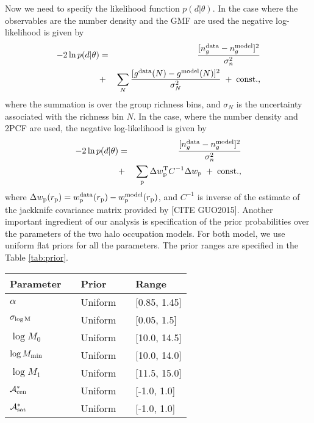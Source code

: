 \documentclass[14pt, preprint]{emulateapj}
\newcommand{\wpp}{w_{\rm p}}
\newcommand{\rpp}{r_{\rm p}}
\newcommand{\mzero}{\log M_{0}}
\newcommand{\mone}{\log M_{1}}
\newcommand{\mmin}{\log M_{\rm min}}
\newcommand{\sigmam}{\sigma_{\log \rm M}}
\newcommand{\acen}{\mathcal{A}_{\rm cen}}
\newcommand{\asat}{\mathcal{A}_{\rm sat}}
\begin{document}
Now we need to specify the likelihood function $p(d|\theta)$. In the case where the observables are the number density and the GMF are used the negative log-likelihood is given by
\begin{eqnarray}
-2\ln p(d|\theta) &=& \frac{[n^{\rm data}_{g}-n^{\rm model}_{g}]^{2}}{\sigma_{n}^{2}} \nonumber \\ &+& \sum_{N} \frac{[ g^{\rm data}(N)-g^{\rm model}(N)]^{2}}{\sigma^{2}_{N}} \; + \; \rm{const.},
\label{eq:lnlike_group}
\end{eqnarray}
where the summation is over the group richness bins, and $\sigma_{N}$ is the uncertainty associated with the richness bin $N$. In the case, where the number density and 2PCF are used, the negative log-likelihood is given by
\begin{eqnarray}
-2\ln p(d|\theta) &=& \frac{[n^{\rm data}_{g}-n^{\rm model}_{g}]^{2}}{\sigma_{n}^{2}} \nonumber \\  
&+&  \sum_{\rm p} \Delta \wpp^{\rm T}C^{-1}\Delta \wpp \; + \; \rm{const.},
\label{eq:lnlike_wp}
\end{eqnarray}
where $\Delta \wpp(\rpp) = \wpp^{\rm data}(\rpp)-\wpp^{\rm model}(\rpp)$, and  $C^{-1}$ is inverse of the estimate of the jackknife covariance matrix provided by [CITE GUO2015]. 
Another important ingredient of our analysis is specification of the prior probabilities over the parameters of the two halo occupation models. For both model, we use uniform flat priors for all the parameters. The prior ranges are specified in the Table \ref{tab:prior}. 

\begin{table*}
\begin{center}
  \label{tab:prior}
  \caption{{\bf Prior Specifications}: The prior probability distribution 
  and its range for each of the parameters. 
  All mass parameters are in unit of $h^{-1}M_\odot$. The parameters marked by $*$ are only used in the Heaviside Assembly bias modeling.}
\begin{tabular}{@{}lllll}
\\ \hline 
    Parameter & & Prior & & Range \\ \hline
  $\alpha$ & & Uniform & & [0.85, 1.45] \\
  $\sigmam$ & & Uniform & &  [0.05, 1.5] \\
   $\mzero$   & & Uniform & &  [10.0, 14.5] \\
  $\mmin$ & &   Uniform & &  [10.0, 14.0] \\
  $\mone$ & & Uniform & & [11.5, 15.0] \\ 
  $\acen^{*}$ & & Uniform & & [-1.0, 1.0] \\
  $\asat^{*}$ & & Uniform & & [-1.0, 1.0] \\
 \hline
  \end{tabular}
\end{center}
\end{table*}
\end{document}
